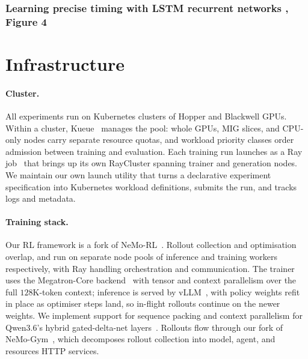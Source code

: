 \documentclass[garamond,a4paper]{inherent}
\begin{document}
\begin{promptcard}

\end{promptcard}

\subsubsection*{Learning precise timing with LSTM recurrent networks \citep{gers2002learning}, Figure 4}

\begin{promptcard}

\end{promptcard}

\FloatBarrier
\newpage

\section{Infrastructure}
\label{app:infra}

\paragraph{Cluster.}
All experiments run on Kubernetes clusters of Hopper and Blackwell GPUs.
Within a cluster, Kueue~\citep{kueue} manages the pool: whole GPUs, MIG slices, and CPU-only nodes carry separate resource quotas, and workload priority classes order admission between training and evaluation.
Each training run launches as a Ray job~\citep{moritz2018ray} that brings up its own RayCluster spanning trainer and generation nodes.
We maintain our own launch utility that turns a declarative experiment specification into Kubernetes workload definitions, submits the run, and tracks logs and metadata.

\paragraph{Training stack.}
Our RL framework is a fork of NeMo-RL~\citep{nemorl}. Rollout collection and optimisation overlap, and run on separate node pools of inference and training workers respectively, with Ray handling orchestration and communication.
The trainer uses the Megatron-Core backend~\citep{shoeybi2019megatron} with tensor and context parallelism over the full $128$K-token context; inference is served by vLLM~\citep{kwon2023vllm}, with policy weights refit in place as optimiser steps land, so in-flight rollouts continue on the newer weights.
We implement support for sequence packing and context parallelism for Qwen3.6's hybrid gated-delta-net layers~\citep{yang2024gateddeltanet}.
Rollouts flow through our fork of NeMo-Gym~\citep{nemogym}, which decomposes rollout collection into model, agent, and resources HTTP services.
\end{document}
